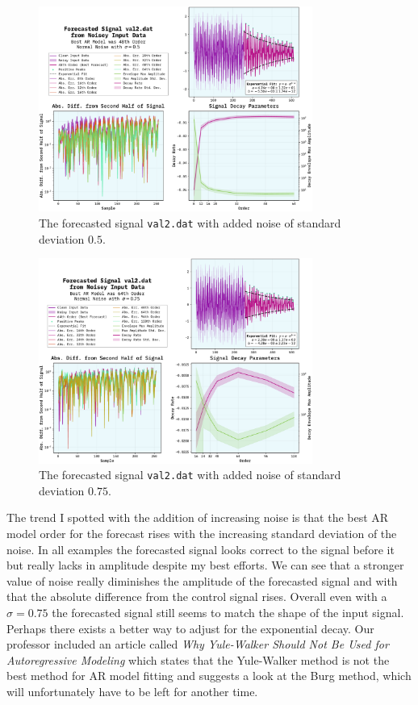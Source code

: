 \documentclass[10pt, titlepage, a4paper]{article}
\begin{document}
\begin{figure}[H]
    \centering
    \includegraphics[width=0.8\textwidth]{../LinForecast/Images/noisey-forecast-val2.dat-0.5.pdf}
    \caption{The forecasted signal \texttt{val2.dat} with added noise of standard deviation $0.5$.}
    \label{fig:noise-2}
\end{figure}

\begin{figure}[H]
    \centering
    \includegraphics[width=0.8\textwidth]{../LinForecast/Images/noisey-forecast-val2.dat-0.75.pdf}
    \caption{The forecasted signal \texttt{val2.dat} with added noise of standard deviation $0.75$.}
    \label{fig:noise-3}
\end{figure}

The trend I spotted with the addition of increasing noise is that the best AR model order for the forecast rises with 
the increasing standard deviation of the noise. In all examples the forecasted signal looks correct to the signal before it 
but really lacks in amplitude despite my best efforts. We can see that a stronger value of noise really diminishes the amplitude 
of the forecasted signal and with that the absolute difference from the control signal rises. Overall even with a 
$\sigma = 0.75$ the forecasted signal still seems to match the shape of the input signal. Perhaps there exists a better way
to adjust for the exponential decay. Our professor included an article called \textit{Why Yule-Walker Should Not Be Used 
for Autoregressive Modeling} \cite{no-yw} which states that the Yule-Walker method is not the best method for AR model
fitting and suggests a look at the Burg method, which will unfortunately have to be left for another time.
\end{document}
